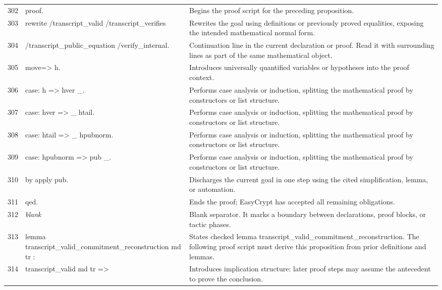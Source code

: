 \documentclass[10pt]{article}
\begin{document}
\begin{longtable}{r L{0.53\textwidth} L{0.37\textwidth}}
302 & {\ttfamily\scriptsize proof.} & Begins the proof script for the preceding proposition. \\
303 & {\ttfamily\scriptsize rewrite /transcript\_valid /transcript\_verifies} & Rewrites the goal using definitions or previously proved equalities, exposing the intended mathematical normal form. \\
304 & {\ttfamily\scriptsize         /transcript\_public\_equation /verify\_internal.} & Continuation line in the current declaration or proof.  Read it with surrounding lines as part of the same mathematical object. \\
305 & {\ttfamily\scriptsize move=> h.} & Introduces universally quantified variables or hypotheses into the proof context. \\
306 & {\ttfamily\scriptsize case: h => hver \_.} & Performs case analysis or induction, splitting the mathematical proof by constructors or list structure. \\
307 & {\ttfamily\scriptsize case: hver => \_ htail.} & Performs case analysis or induction, splitting the mathematical proof by constructors or list structure. \\
308 & {\ttfamily\scriptsize case: htail => \_ hpubnorm.} & Performs case analysis or induction, splitting the mathematical proof by constructors or list structure. \\
309 & {\ttfamily\scriptsize case: hpubnorm => pub \_.} & Performs case analysis or induction, splitting the mathematical proof by constructors or list structure. \\
310 & {\ttfamily\scriptsize by apply pub.} & Discharges the current goal in one step using the cited simplification, lemma, or automation. \\
311 & {\ttfamily\scriptsize qed.} & Ends the proof; EasyCrypt has accepted all remaining obligations. \\
312 & {\ttfamily\scriptsize \emph{blank}} & Blank separator.  It marks a boundary between declarations, proof blocks, or tactic phases. \\
313 & {\ttfamily\scriptsize lemma transcript\_valid\_commitment\_reconstruction md tr :} & States checked lemma transcript\_valid\_commitment\_reconstruction.  The following proof script must derive this proposition from prior definitions and lemmas. \\
314 & {\ttfamily\scriptsize   transcript\_valid md tr =>} & Introduces implication structure: later proof steps may assume the antecedent to prove the conclusion. \\

\end{longtable}
\end{document}
